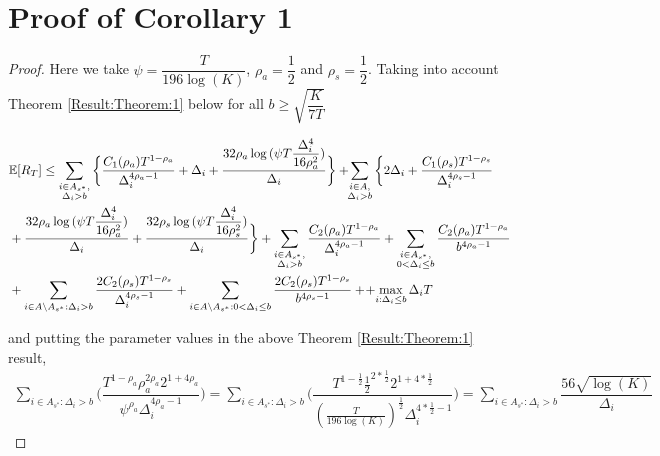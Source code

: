 \section{Proof of Corollary 1}
\label{App:Proof:Corollary:1}
\begin{proof}
Here we take $\psi=\dfrac{T}{196 \log(K)}$, $\rho_{a}=\dfrac{1}{2}$ and $\rho_{s}=\dfrac{1}{2}$. Taking into account Theorem \ref{Result:Theorem:1} below for all $b\geq \sqrt{\dfrac{K}{7T}}$

\begin{align*}
&\mathbb{E} [R_{T}]\leq 
\sum\limits_{\substack{i\in A_{s^{*}},\\\Delta_{i} > b}}\bigg\lbrace \dfrac{C_1(\rho_{a})T^{1-\rho_{a}}}{\Delta_{i}^{4\rho_{a}-1}} + \Delta_{i}
 + \frac{32\rho_{a}\log{(\psi T\dfrac{\Delta_{i}^{4}}{16\rho_{a}^{2}})}}{\Delta_{i}} \bigg\rbrace
 + \! \! \sum\limits_{\substack{i\in A,\\\Delta_{i} > b}} \bigg\lbrace 2\Delta_{i}+
\dfrac{C_1(\rho_{s})T^{1-\rho_{s}}}{\Delta_{i}^{4\rho_{s}-1}} \\
&+ \frac{32\rho_{a}\log{(\psi T\dfrac{\Delta_{i}^{4}}{16\rho_{a}^{2}})}}{\Delta_{i}} 
+ \dfrac{32\rho_{s}\log{(\psi T\dfrac{\Delta_{i}^{4}}{16\rho_{s}^{2}})}}{\Delta_{i}}\bigg\rbrace 
+ \sum\limits_{\substack{i\in A_{s^{*}},\\ \Delta_{i} > b}} 
\frac{C_2(\rho_{a})T^{1-\rho_{a}}}{\Delta_{i}^{4\rho_{a}-1}}
+\sum\limits_{\substack{i\in A_{s^{*}},\\0 < \Delta_{i}\leq b}}\frac{C_2(\rho_a)T^{1-\rho_{a}}}{b^{4\rho_{a} -1}}\\ 
 & + \sum_{i\in A\setminus A_{s^*}: \Delta_{i} > b}\dfrac{2C_{2}(\rho_{s})T^{1-\rho_{s}}}{\Delta_{i}^{4\rho_{s}-1}} +\sum_{i\in A\setminus A_{s^*}: 0 < \Delta_{i} \leq b}\dfrac{2C_{2}(\rho_{s})T^{1-\rho_{s}}}{b^{4\rho_{s}-1}} +
 \!+\! \max\limits_{i:\Delta_{i}\leq b}\Delta_{i}T
\end{align*}

and putting the parameter values in the above Theorem \ref{Result:Theorem:1} result,
	\begin{align*}
	\sum_{i\in A_{s^{*}}:\Delta_{i} > b}\bigg(\dfrac{T^{1-\rho_{a}}\rho_{a}^{2\rho_{a}}2^{1+4\rho_{a}}}{\psi^{\rho_{a}}\Delta_{i}^{4\rho_{a}-1}} \bigg)= \sum_{i\in A_{s^{*}}:\Delta_{i} > b}\bigg(\dfrac{T^{1-\frac{1}{2}}\frac{1}{2}^{2*\frac{1}{2}}2^{1+4*\frac{1}{2}}}{(\frac{T}{196 \log (K)})^{\frac{1}{2}}\Delta_{i}^{4*\frac{1}{2}-1}} \bigg)=\sum_{i\in A_{s^{*}}:\Delta_{i} > b}\dfrac{56\sqrt{\log (K)}}{\Delta_{i}}
	\end{align*}
	

\end{proof}
